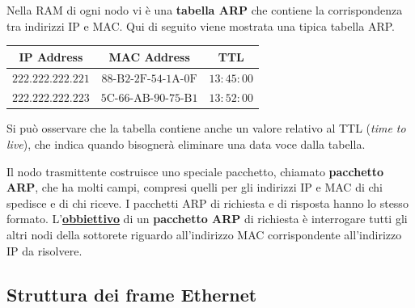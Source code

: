 \documentclass[a4paper]{article}
\begin{document}
	\noindent
	Nella RAM di ogni nodo vi è una \textbf{tabella ARP} che contiene la corrispondenza tra indirizzi IP e MAC. Qui di seguito viene mostrata una tipica tabella ARP.
	\begin{table}[!htbp]
		\centering
		\begin{tabular}{@{} c c c @{}}
			\toprule
			IP Address	& MAC Address	& TTL \\
			\midrule
			$222.222.222.221$	& $\mathrm{88\text{-}B2\text{-}2F\text{-}54\text{-}1A\text{-}0F}$	& $13:45:00$ \\
			$222.222.222.223$	& $\mathrm{5C\text{-}66\text{-}AB\text{-}90\text{-}75\text{-}B1}$	& $13:52:00$ \\
			\bottomrule
		\end{tabular}
	\end{table}

	\noindent
	Si può osservare che la tabella contiene anche un valore relativo al TTL (\emph{time to live}), che indica quando bisognerà eliminare una data voce dalla tabella.\newline
	
	\noindent
	Il nodo trasmittente costruisce uno speciale pacchetto, chiamato \textbf{pacchetto ARP}, che ha molti campi, compresi quelli per gli indirizzi IP e MAC di chi spedisce e di chi riceve. I pacchetti ARP di richiesta e di risposta hanno lo stesso formato.\newline
	L’\underline{\textbf{obbiettivo}} di un \textbf{pacchetto ARP} di richiesta è interrogare tutti gli altri nodi della sottorete riguardo all’indirizzo MAC corrispondente all’indirizzo IP da risolvere.\newpage
	
	\subsection{Struttura dei frame Ethernet}
	
\end{document}
